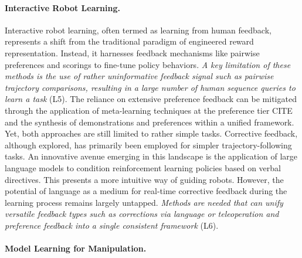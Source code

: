 \begin{refsection}
\paragraph{Interactive Robot Learning.} Interactive robot learning, often termed as learning from human feedback, represents a shift from the traditional paradigm of engineered reward representation. Instead, it harnesses feedback mechanisms like pairwise preferences and scorings to fine-tune policy behaviors. 
\textit{A key limitation of these methods is the use of rather uninformative feedback signal such as pairwise trajectory comparisons, resulting in a large number of human sequence queries to learn a task} (L5). The reliance on extensive preference feedback can be mitigated through the application of meta-learning techniques at the preference tier CITE and the synthesis of demonstrations and preferences within a unified framework. Yet, both approaches are still limited to rather simple tasks. Corrective feedback, although explored, has primarily been employed for simpler trajectory-following tasks. An innovative avenue emerging in this landscape is the application of large language models to condition reinforcement learning policies based on verbal directives. This presents a more intuitive way of guiding robots. However, the potential of language as a medium for real-time corrective feedback during the learning process remains largely untapped. \textit{Methods are needed that can unify versatile feedback types such as corrections via language or teleoperation and preference feedback into a single consistent framework} (L6).
\vspace{-0.3cm}
\paragraph{Model Learning for Manipulation.}


\end{refsection}
